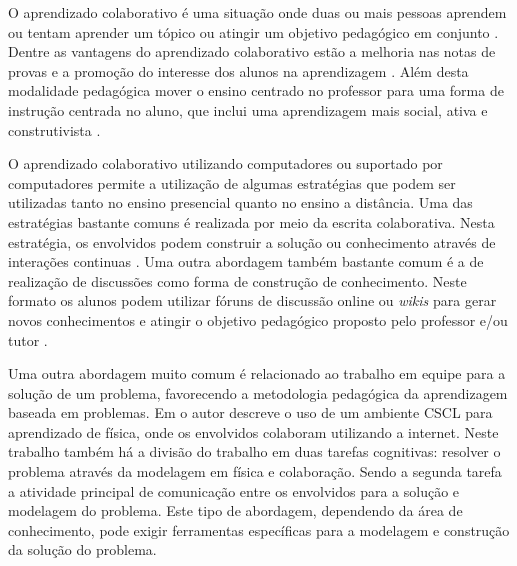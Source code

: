 
O aprendizado colaborativo é uma situação onde duas ou mais pessoas aprendem ou tentam aprender um tópico ou atingir um objetivo pedagógico em conjunto \cite{chuang_sscls_2015}. Dentre as vantagens do aprendizado colaborativo estão a melhoria nas notas de provas e a promoção do interesse dos alunos na aprendizagem \cite{caldwell_2007, pollock_2006}. Além desta modalidade pedagógica mover o ensino centrado no professor para uma forma de instrução centrada no aluno, que inclui uma aprendizagem mais social, ativa e construtivista \cite{kirschner_2001}.

O aprendizado colaborativo utilizando computadores ou suportado por computadores permite a utilização de algumas estratégias que podem ser utilizadas tanto no ensino presencial quanto no ensino a distância. Uma das estratégias bastante comuns é realizada por meio da escrita colaborativa. Nesta estratégia, os envolvidos podem construir a solução ou conhecimento através de interações continuas \cite{onrubia_2009}. Uma outra abordagem também bastante comum é a de realização de discussões como forma de construção de conhecimento. Neste formato os alunos podem utilizar fóruns de discussão online ou \emph{wikis} para gerar novos conhecimentos e atingir o objetivo pedagógico proposto pelo professor e/ou tutor \cite{ramanau_researching_2009}.

Uma outra abordagem muito comum é relacionado ao trabalho em equipe para a solução de um problema, favorecendo a metodologia pedagógica da aprendizagem baseada em problemas. Em \cite{baker_1997} o autor descreve o uso de um ambiente CSCL para aprendizado de física, onde os envolvidos colaboram utilizando a internet. Neste trabalho também há a divisão do trabalho em duas tarefas cognitivas: resolver o problema através da modelagem em física e colaboração. Sendo a segunda tarefa a atividade principal de comunicação entre os envolvidos para a solução e modelagem do problema. Este tipo de abordagem, dependendo da área de conhecimento, pode exigir ferramentas específicas para a modelagem e construção da solução do problema.


